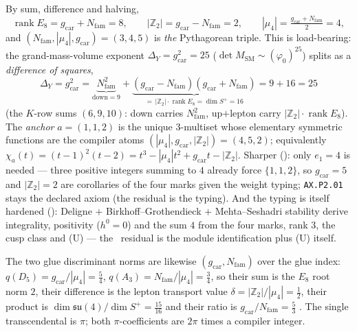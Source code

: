 \documentclass[11pt,a4paper]{article}
\newcommand{\phiz}{\varphi_0}
\newcommand{\gcar}{g_{\mathrm{car}}}
\newcommand{\Nfam}{N_{\mathrm{fam}}}
\newcommand{\Z}{\mathbb Z}
\begin{document}
\begin{keybox}
By sum, difference and halving,
\[
  \operatorname{rank}E_8=\gcar{+}\Nfam=8,\qquad |\Z_2|=\gcar{-}\Nfam=2,\qquad |\mu_4|=\tfrac{\gcar+\Nfam}{2}=4,
\]
and $(\Nfam,|\mu_4|,\gcar)=(3,4,5)$ is \emph{the} Pythagorean triple. This is load-bearing: the
grand-mass-volume exponent $\Delta_Y=\gcar^2=25$ ($\det M_{\mathrm{SM}}\sim(\phiz)^{25}$) splits as a
\emph{difference of squares},
\[
  \boxed{\ \Delta_Y=\gcar^2=\underbrace{\Nfam^2}_{\text{down}=9}
  +\underbrace{(\gcar{-}\Nfam)(\gcar{+}\Nfam)}_{=\,|\Z_2|\cdot\operatorname{rank}E_8=\dim S^+=16}
  =9+16=25\ }
\]
(the $K$-row sums $(6,9,10)$: down carries $\Nfam^2$, up$+$lepton carry $|\Z_2|\!\cdot\!\operatorname{rank}E_8$).
The \emph{anchor} $a=(1,1,2)$ is the unique $3$-multiset whose elementary symmetric functions are the
compiler atoms $(|\mu_4|,\gcar,|\Z_2|)=(4,5,2)$; equivalently $\chi_a(t)=(t{-}1)^2(t{-}2)=t^3-|\mu_4|t^2+\gcar t-|\Z_2|$.
Sharper (): only $e_1{=}4$ is needed --- three positive integers
summing to $4$ already force $\{1,1,2\}$, so $\gcar{=}5$ and $|\Z_2|{=}2$ are corollaries of the four
marks given the weight typing; \texttt{AX.P2.01} stays the declared axiom (the residual is the typing).
And the typing is itself hardened (): Deligne $+$
Birkhoff--Grothendieck $+$ Mehta--Seshadri stability derive integrality, positivity ($h^0{=}0$) and the
sum $4$ from the four marks, rank $3$, the cusp class and (U) --- the \mC\ residual is the module
identification plus (U) itself.
\end{keybox}

The two glue discriminant norms are likewise $(\gcar,\Nfam)$ over the glue index: $q(D_5)=\gcar/|\mu_4|=\tfrac54$,
$q(A_3)=\Nfam/|\mu_4|=\tfrac34$, so their sum is the $E_8$ root norm $2$, their difference is the lepton
transport value $\delta=|\Z_2|/|\mu_4|=\tfrac12$, their product is $\dim\mathfrak{su}(4)/\dim S^+=\tfrac{15}{16}$
and their ratio is $\gcar/\Nfam=\tfrac53$ . The single transcendental is
$\pi$; both $\pi$-coefficients are $2\pi$ times a compiler integer.
\end{document}

